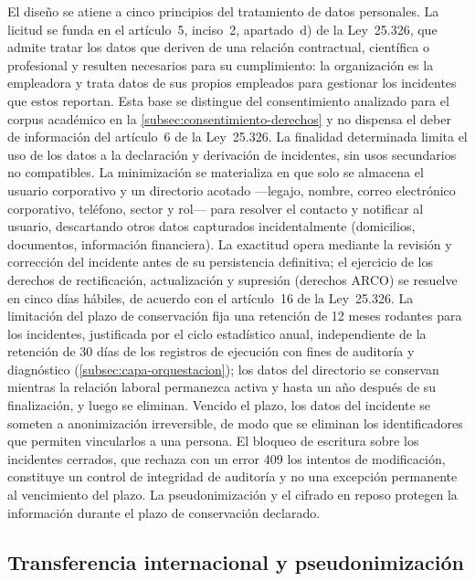 El diseño se atiene a cinco principios del tratamiento de datos personales. La licitud se funda en el artículo~5, inciso~2, apartado~d) de la Ley~25.326, que admite tratar los datos que deriven de una relación contractual, científica o profesional y resulten necesarios para su cumplimiento: la organización es la empleadora y trata datos de sus propios empleados para gestionar los incidentes que estos reportan. Esta base se distingue del consentimiento analizado para el corpus académico en la \autoref{subsec:consentimiento-derechos} y no dispensa el deber de información del artículo~6 de la Ley~25.326. La finalidad determinada limita el uso de los datos a la declaración y derivación de incidentes, sin usos secundarios no compatibles. La minimización se materializa en que solo se almacena el usuario corporativo y un directorio acotado ---legajo, nombre, correo electrónico corporativo, teléfono, sector y rol--- para resolver el contacto y notificar al usuario, descartando otros datos capturados incidentalmente (domicilios, documentos, información financiera). La exactitud opera mediante la revisión y corrección del incidente antes de su persistencia definitiva; el ejercicio de los derechos de rectificación, actualización y supresión (derechos ARCO) se resuelve en cinco días hábiles, de acuerdo con el artículo~16 de la Ley~25.326. La limitación del plazo de conservación fija una retención de 12 meses rodantes para los incidentes, justificada por el ciclo estadístico anual, independiente de la retención de 30 días de los registros de ejecución con fines de auditoría y diagnóstico (\autoref{subsec:capa-orquestacion}); los datos del directorio se conservan mientras la relación laboral permanezca activa y hasta un año después de su finalización, y luego se eliminan. Vencido el plazo, los datos del incidente se someten a anonimización irreversible, de modo que se eliminan los identificadores que permiten vincularlos a una persona. El bloqueo de escritura sobre los incidentes cerrados, que rechaza con un error 409 los intentos de modificación, constituye un control de integridad de auditoría y no una excepción permanente al vencimiento del plazo. La pseudonimización y el cifrado en reposo protegen la información durante el plazo de conservación declarado.

\subsection{Transferencia internacional y pseudonimización}\label{subsec:transferencia-internacional}

